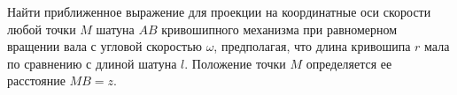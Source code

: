 Найти приближенное выражение для проекции на координатные оси скорости
любой точки $M$ шатуна $AB$ кривошипного механизма при равномерном вращении
вала с угловой скоростью $\omega$, предполагая, что длина кривошипа $r$
мала по сравнению с длиной шатуна $l$.
Положение точки $M$ определяется ее расстояние $MB = z$.
